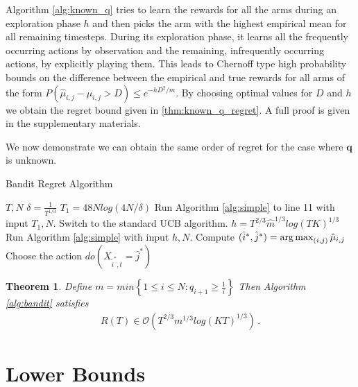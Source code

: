 \documentclass{article}
\newcommand{\set}[1]{\left\{#1\right\}}
\newcommand{\argmax}{\operatornamewithlimits{arg\,max}}
\newcommand{\eq}[1]{\begin{align*}#1\end{align*}}
\newcommand{\bigo}[1]{\mathcal{O}\left( #1 \right)}
\theoremstyle{plain}
\newtheorem{theorem}{Theorem}
\theoremstyle{definition}
\begin{document}
Algorithm \ref{alg:known_q} tries to learn the rewards for all the arms during an exploration phase $h$ and then picks the arm with the highest empirical mean for all remaining timesteps. During its exploration phase, it learns all the frequently occurring actions by observation and the remaining, infrequently occurring actions, by explicitly playing them. This leads to Chernoff type high probability bounds on the difference between the empirical and true rewards for all arms of the form $P(\hat{\mu}_{i,j} - \mu_{i,j} > D) \leq e^{-hD^2/m}$. By choosing optimal values for $D$ and $h$ we obtain the regret bound given in \cref{thm:known_q_regret}. A full proof is given in the supplementary materials. 

We now demonstrate we can obtain the same order of regret for the case where $\boldsymbol{q}$ is unknown. 

\begin{algorithm}[h]
\caption{Bandit Regret Algorithm}\label{alg:bandit}
\begin{algorithmic}[1]
 $T, N$
\STATE $\delta = \frac{1}{T^{1/3}}$ 
\STATE $T_1 = 48Nlog\left(4N/\delta\right)$ 
\STATE Run Algorithm \ref{alg:simple} to line 11 with input $T_1,N$.
\STATE Switch to the standard UCB algorithm.
\ELSE
\STATE $h = T^{2/3}\hat{m}^{1/3}log(TK)^{1/3}$ 
\STATE Run Algorithm \ref{alg:simple} with input $h,N$.
\STATE Compute $(\hat{i}^*,\hat{j}^*) = \argmax_{(i,j)} \hat{\mu}_{i,j}$
\STATE Choose the action $do(X_{\hat{i}^*,t} = \hat{j}^*)$
\ENDFOR
\ENDIF
\end{algorithmic}
\end{algorithm}

\begin{theorem}\label{thm:unknown_q_regret}
Define $m =   min\set{1 \leq i \leq N:q_{i+1} \geq \frac{1}{i}}$
Then Algorithm \ref{alg:bandit} satisfies
\eq{
R(T) \in \bigo{T^{2/3}m^{1/3}log(KT)^{1/3}}\,.
}
\end{theorem}


\section{Lower Bounds}



\end{document}
